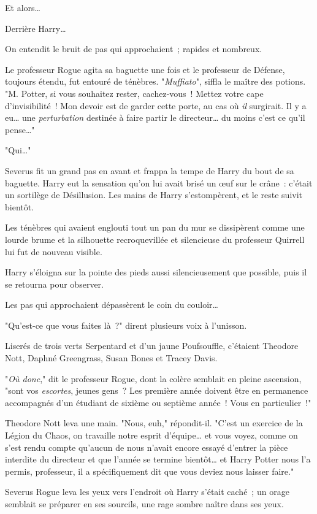 Et alors…

Derrière Harry…

On entendit le bruit de pas qui approchaient~; rapides et nombreux.

Le professeur Rogue agita sa baguette une fois et le professeur de Défense, toujours étendu, fut entouré de ténèbres. "\emph{Muffiato}", siffla le maître des potions. "M. Potter, si vous souhaitez rester, cachez-vous~! Mettez votre cape d'invisibilité~! Mon devoir est de garder cette porte, au cas où \emph{il} surgirait. Il y a eu… une \emph{perturbation} destinée à faire partir le directeur… du moins c'est ce qu'il pense…"

"Qui…"

Severus fit un grand pas en avant et frappa la tempe de Harry du bout de sa baguette. Harry eut la sensation qu'on lui avait brisé un œuf sur le crâne~: c'était un sortilège de Désillusion. Les mains de Harry s'estompèrent, et le reste suivit bientôt.

Les ténèbres qui avaient englouti tout un pan du mur se dissipèrent comme une lourde brume et la silhouette recroquevillée et silencieuse du professeur Quirrell lui fut de nouveau visible.

Harry s'éloigna sur la pointe des pieds aussi silencieusement que possible, puis il se retourna pour observer.

Les pas qui approchaient dépassèrent le coin du couloir…

"Qu'est-ce que vous faites là~?" dirent plusieurs voix à l'unisson.

Liserés de trois verts Serpentard et d'un jaune Poufsouffle, c'étaient Theodore Nott, Daphné Greengrass, Susan Bones et Tracey Davis.

"\emph{Où donc}," dit le professeur Rogue, dont la colère semblait en pleine ascension, "sont vos \emph{escortes}, jeunes gens~? Les première année doivent être en permanence accompagnés d'un étudiant de sixième ou septième année~! Vous en particulier~!"

Theodore Nott leva une main. "Nous, euh," répondit-il. "C'est un exercice de la Légion du Chaos, on travaille notre esprit d'équipe… et vous voyez, comme on s'est rendu compte qu'aucun de nous n'avait encore essayé d'entrer la pièce interdite du directeur et que l'année se termine bientôt… et Harry Potter nous l'a permis, professeur, il a spécifiquement dit que vous deviez nous laisser faire."

Severus Rogue leva les yeux vers l'endroit où Harry s'était caché~; un orage semblait se préparer en ses sourcils, une rage sombre naître dans ses yeux.

